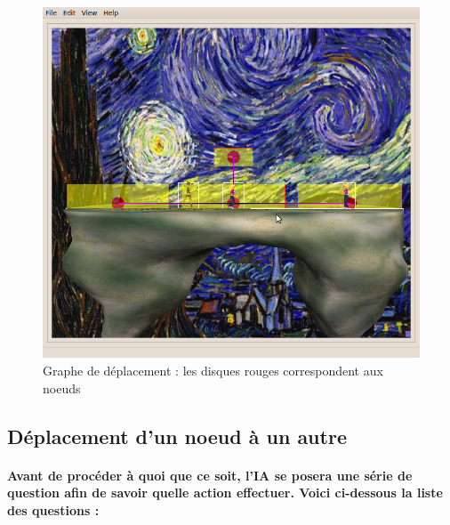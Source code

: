 \begin{figure}[h]
\center
\includegraphics[scale=0.4]{visuel/capture-deplacement.png}
\caption{Graphe de déplacement : les disques rouges correspondent aux noeuds}
\end{figure}



\subsection{Déplacement d'un noeud à un autre}
\vspace{0.5cm}

\paragraph{Avant de procéder à quoi que ce soit, l'IA se posera une série de question afin de savoir quelle action effectuer. Voici ci-dessous la liste des questions : }

